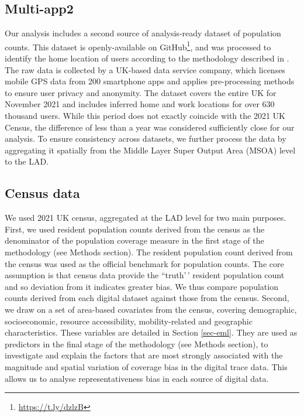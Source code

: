 \documentclass[]{rsos}%
\begin{document}
\subsection{Multi-app2}\label{multi-app2}

Our analysis includes a second source of analysis-ready dataset of
population counts. This dataset is openly-available on GitHub\footnote{\url{https://t.ly/dzlzB}}, and was processed to
identify the home location of users according to the methodology
described in \citep{zhong24working}. The raw data is collected by a UK-based
data service company, which licenses mobile GPS data from 200 smartphone
apps and applies pre-processing methods to ensure user privacy and
anonymity. The dataset covers the entire UK for November 2021 and
includes inferred home and work locations for over 630 thousand users. While this
period does not exactly coincide with the 2021 UK Census, the difference
of less than a year was considered sufficiently close for our analysis.
To ensure consistency across datasets, we further process the data by
aggregating it spatially from the Middle Layer Super Output Area (MSOA)
level to the LAD.

\subsection{Census data}\label{census-data}

We used 2021 UK census, aggregated at the LAD level for two main
purposes. First, we used resident population counts derived from the
census as the denominator of the population coverage measure in the
first stage of the methodology (see Methods section). The resident
population count derived from the census was used as the official
benchmark for population counts. The core assumption is that census data provide the ``truth'\,'
resident population count and so deviation from it indicates greater bias. We thus compare population
counts derived from each digital dataset against those from the census.
Second, we draw on a set
of area-based covariates from the census, covering demographic,
socioeconomic, resource accessibility, mobility-related and geographic
characteristics. These variables are detailed in Section \ref{sec-eml}. They are used as predictors in the final stage of the
methodology (see Methods section), to investigate and explain the
factors that are most strongly associated with the magnitude and spatial
variation of coverage bias in the digital trace data. This allows us to
analyse representativeness bias in each source of digital data.
\end{document}

